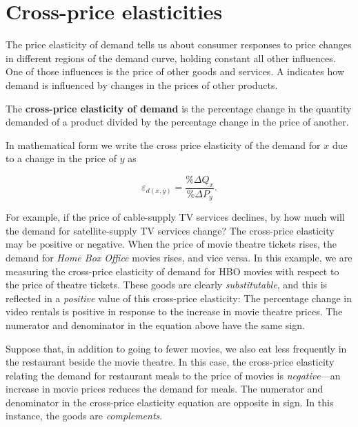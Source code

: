 \section{Cross-price elasticities}\label{sec:ch4sec4}

The price elasticity of demand tells us about consumer responses to price changes in different regions of the demand curve, holding constant all other influences. One of those influences is the price of other goods and services. A  indicates how demand is influenced by changes in the prices of other products. 

\begin{DefBox}
The \textbf{cross-price elasticity of demand} is the percentage change in the quantity demanded of a product divided by the percentage change in the price of another.
\end{DefBox}

In mathematical form we write the cross price elasticity of the demand for $x$ due to a change in the price of $y$ as

\begin{equation*}
\varepsilon_{d(x,y)}=\frac{\%\Delta Q_x}{\%\Delta P_y}.
\end{equation*}

For example, if the price of cable-supply TV services declines, by how much will the demand for satellite-supply TV services change?  The cross-price elasticity may be positive or negative. When the price of movie theatre tickets rises, the demand for \textit{Home Box Office} movies rises, and vice versa. In this example, we are measuring the cross-price elasticity of demand for HBO movies with respect to the price of theatre tickets. These goods are clearly \textit{substitutable}, and this is reflected in a \textit{positive} value of this cross-price elasticity: The percentage change in video rentals is positive in response to the increase in movie theatre prices. The numerator and denominator in the equation above have the same sign.

Suppose that, in addition to going to fewer movies, we also eat less frequently in the restaurant beside the movie theatre. In this case, the cross-price elasticity relating the demand for restaurant meals to the price of movies is \textit{negative}---an increase in movie prices reduces the demand for meals. The numerator and denominator in the cross-price elasticity equation are opposite in sign. In this instance, the goods are \textit{complements}.